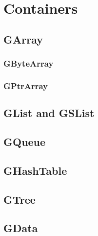 \chapter{Containers}

\section{GArray}
\subsection{GByteArray}
\subsection{GPtrArray}

\section{GList and GSList}

\section{GQueue}

\section{GHashTable}

\section{GTree}

\section{GData}
